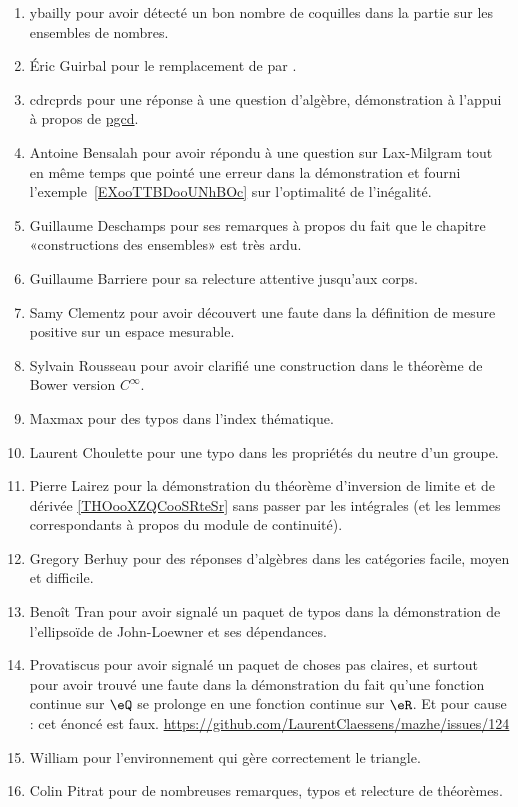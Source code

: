 \begin{enumerate}
    \item
        ybailly pour avoir détecté un bon nombre de coquilles dans la partie sur les ensembles de nombres.
    \item
        Éric Guirbal pour le remplacement de  par .
    \item
        cdrcprds pour une réponse à une question d'algèbre, démonstration à l'appui à propos de \href{https://github.com/LaurentClaessens/mazhe/issues/52#issuecomment-333251728}{pgcd}.
    \item
        Antoine Bensalah pour avoir répondu à une question sur Lax-Milgram tout en même temps que pointé une erreur dans la démonstration et fourni l'exemple~\ref{EXooTTBDooUNhBOc} sur l'optimalité de l'inégalité.
    \item
        Guillaume Deschamps pour ses remarques à propos du fait que le chapitre «constructions des ensembles» est très ardu.
    \item
        Guillaume Barriere pour sa relecture attentive jusqu'aux corps.
    \item
        Samy Clementz pour avoir découvert une faute dans la définition de mesure positive sur un espace mesurable.
    \item
        Sylvain Rousseau pour avoir clarifié une construction dans le théorème de Bower version \(  C^{\infty}\).
    \item
        Maxmax pour des typos dans l'index thématique.
    \item
        Laurent Choulette pour une typo dans les propriétés du neutre d'un groupe.
    \item
        Pierre Lairez pour la démonstration du théorème d'inversion de limite et de dérivée \ref{THOooXZQCooSRteSr} sans passer par les intégrales (et les lemmes correspondants à propos du module de continuité).
    \item
        Gregory Berhuy pour des réponses d'algèbres dans les catégories facile, moyen et difficile.
    \item
        Benoît Tran pour avoir signalé un paquet de typos dans la démonstration de l'ellipsoïde de John-Loewner et ses dépendances.
    \item
        Provatiscus pour avoir signalé un paquet de choses pas claires, et surtout pour avoir trouvé une faute dans la démonstration du fait qu'une fonction continue sur \( \eQ\) se prolonge en une fonction continue sur \( \eR\). Et pour cause : cet énoncé est faux. \url{https://github.com/LaurentClaessens/mazhe/issues/124}
    \item 
        William pour l'environnement  qui gère correctement le triangle.
    \item
        Colin Pitrat pour de nombreuses remarques, typos et relecture de théorèmes.
\end{enumerate}

